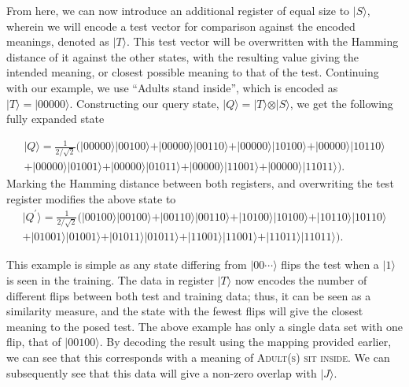 From here, we can now introduce an additional register of equal size to $\vert S\rangle$, wherein we will encode a test vector for comparison against the encoded meanings, denoted as $\vert T \rangle$. This test vector will be overwritten with the Hamming distance of it against the other states, with the resulting value giving the intended meaning, or closest possible meaning to that of the test. Continuing with our example, we use ``Adults stand inside'', which is encoded as $\vert T \rangle = \vert 00000 \rangle$. Constructing our query state, $\vert Q \rangle = \vert T \rangle \otimes \vert S\rangle$, we get the following fully expanded state

\begin{eqnarray*}
\vert Q \rangle = \frac{1}{2/\sqrt{2}} (\vert 00000 \rangle\vert 00100 \rangle + \vert 00000 \rangle\vert 00110 \rangle + \vert 00000 \rangle\vert 10100 \rangle + \vert 00000 \rangle\vert 10110 \rangle \\+\vert 00000 \rangle\vert 01001 \rangle + \vert 00000 \rangle\vert 01011 \rangle + \vert 00000 \rangle\vert 11001 \rangle + \vert 00000 \rangle\vert 11011 \rangle).
\end{eqnarray*}
Marking the Hamming distance between both registers, and overwriting the test register modifies the above state to
\begin{eqnarray*}
\vert Q^{\prime} \rangle = \frac{1}{2/\sqrt{2}} (\vert 00100 \rangle\vert 00100 \rangle + \vert 00110 \rangle\vert 00110 \rangle + \vert 10100 \rangle\vert 10100 \rangle +  \vert 10110 \rangle\vert 10110 \rangle \\+\vert 01001 \rangle\vert 01001 \rangle + \vert 01011 \rangle\vert 01011 \rangle + \vert 11001 \rangle\vert 11001 \rangle + \vert 11011 \rangle\vert 11011 \rangle).
\end{eqnarray*}

This example is simple as any state differing from $\vert 00\cdots\rangle$ flips the test when a $\vert 1\rangle$ is seen in the training. The data in register $\vert T \rangle$ now encodes the number of different flips between both test and training data; thus, it can be seen as a similarity measure, and the state with the fewest flips will give the closest meaning to the posed test. The above example has only a single data set with one flip, that of $\vert 00100 \rangle$. By decoding the result using the mapping provided earlier, we can see that this corresponds with a meaning of \textsc{Adult(s) sit inside}. We can subsequently see that this data will give a non-zero overlap with $\vert J \rangle$.


